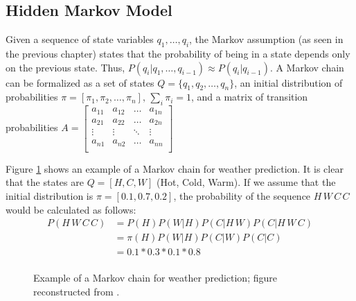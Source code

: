 \documentclass{KBook}
\begin{document}
\subsection{Hidden Markov Model}

Given a sequence of state variables $q_1, \ldots, q_i$, the Markov assumption (as seen in the previous chapter) states that the probability of being in a state depends only on the previous state. Thus, $P(q_i | q_1, \ldots, q_{i-1}) \approx P(q_i | q_{i-1})$. A Markov chain can be formalized as a set of states $Q = \{q_1, q_2, \ldots, q_n\}$, an initial distribution of probabilities $\pi = [\pi_1, \pi_2, \ldots, \pi_n ],\, \sum_i \pi_i = 1$, and a matrix of transition probabilities
$
A = \begin{bmatrix}%
	a_{11} & a_{12} & \ldots & a_{1n} \\
	a_{21} & a_{22} & \ldots & a_{2n} \\
	\vdots & \vdots & \ddots & \vdots \\
	a_{n1} & a_{n2} & \ldots & a_{nn} \\
\end{bmatrix}
$

Figure \ref{fig:cm-exp} shows an example of a Markov chain for weather prediction. It is clear that the states are $Q = [H, C, W]$ (Hot, Cold, Warm). If we assume that the initial distribution is $\pi = [0.1, 0.7, 0.2]$, the probability of the sequence $H\, W\, C\, C$ would be calculated as follows:
\begin{align*}
	P(H\, W\, C\, C) & = P(H) P(W | H) P(C | H\, W) P(C | H\, W\, C) \\
	& = \pi(H) P(W | H) P(C | W) P(C | C) \\
	& = 0.1 * 0.3 * 0.1 * 0.8 \\
\end{align*}

\begin{figure}[ht]
	\centering
	\caption[Example of a Markov chain for weather prediction.]{Example of a Markov chain for weather prediction; figure reconstructed from \cite{2019-jurafsky-martin}.}
	\label{fig:cm-exp}
\end{figure}
\end{document}
